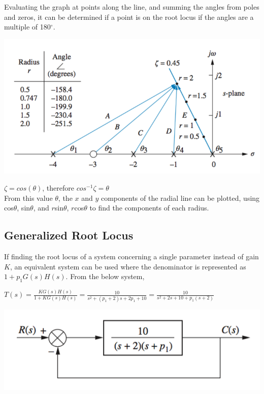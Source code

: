 \documentclass[11pt]{article}
\begin{document}
    Evaluating the graph at points along the line, and summing the angles from poles and zeros, it can be determined if a point is on the root locus if the angles are a multiple of 180$^\circ$.

    \begin{center}
        \includegraphics[width=300 px]{img/calibrating} \\
    \end{center}  

    $\zeta = cos(\theta)$, therefore $cos^{-1}\zeta = \theta$ \\ 

    From this value $\theta$, the $x$ and $y$ components of the radial line can be plotted, using cos$\theta$, sin$\theta$, and $r$sin$\theta$, $r$cos$\theta$ to find the components of each radius. 

    \subsection{Generalized Root Locus}

    If finding the root locus of a system concerning a single parameter instead of gain $K$, an equivalent system can be used where the denominator is represented as $1 + p_1G(s)H(s)$. From the below system,\\ 
    \begin{center}
    $T(s) = \frac{KG(s)H(s)}{1 + KG(s)H(s)} = \frac{10}{s^2 + (p_1 +2)s + 2p_1 + 10} = \frac{10}{s^2 + 2s + 10 + p_1(s + 2)}$
    \end{center}

    \begin{center}
        \includegraphics[width=300 px]{img/parameter1} \\
    \end{center}
\end{document}
